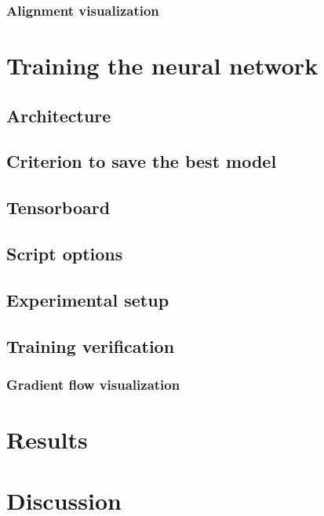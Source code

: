 \subsubsection{Alignment visualization}

\section{Training the neural network}
\subsection{Architecture}
\subsection{Criterion to save the best model}
\subsection{Tensorboard}
\label{paper_tensorboard}
\subsection{Script options}
\subsection{Experimental setup}
\subsection{Training verification}
\subsubsection{Gradient flow visualization}

\section{Results}

\section{Discussion}